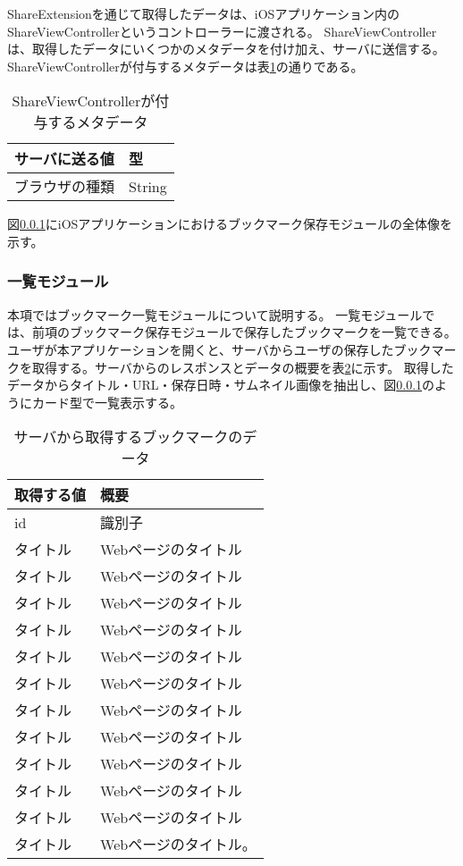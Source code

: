 ShareExtensionを通じて取得したデータは、iOSアプリケーション内のShareViewControllerというコントローラーに渡される。
ShareViewControllerは、取得したデータにいくつかのメタデータを付け加え、サーバに送信する。
ShareViewControllerが付与するメタデータは表\ref{tb:ios-meta-data}の通りである。

\begin{table}[htbp]
  \label{tb:ios-meta-data}
  \caption{ShareViewControllerが付与するメタデータ}
  \begin{center}
    \begin{tabular}{|l|l|}
    \hline
    サーバに送る値 & 型 \\ \hline
    ブラウザの種類 & String \\ \hline
    \end{tabular}
  \end{center}
\end{table}

図\ref{}にiOSアプリケーションにおけるブックマーク保存モジュールの全体像を示す。

\subsubsection{一覧モジュール}
本項ではブックマーク一覧モジュールについて説明する。
一覧モジュールでは、前項のブックマーク保存モジュールで保存したブックマークを一覧できる。
ユーザが本アプリケーションを開くと、サーバからユーザの保存したブックマークを取得する。サーバからのレスポンスとデータの概要を表\ref{tb:ios-bookmark-response}に示す。
取得したデータからタイトル・URL・保存日時・サムネイル画像を抽出し、図\ref{}のようにカード型で一覧表示する。

\begin{table}[htbp]
  \label{tb:ios-bookmark-response}
  \caption{サーバから取得するブックマークのデータ}
  \begin{center}
    \begin{tabular}{|l|l|}
    \hline
    取得する値 & 概要 \\ \hline
    id & 識別子 \\ \hline
    タイトル & Webページのタイトル \\ \hline
    タイトル & Webページのタイトル \\ \hline
    タイトル & Webページのタイトル \\ \hline
    タイトル & Webページのタイトル \\ \hline
    タイトル & Webページのタイトル \\ \hline
    タイトル & Webページのタイトル \\ \hline
    タイトル & Webページのタイトル \\ \hline
    タイトル & Webページのタイトル \\ \hline
    タイトル & Webページのタイトル \\ \hline
    タイトル & Webページのタイトル \\ \hline
    タイトル & Webページのタイトル \\ \hline
    タイトル & Webページのタイトル。 \\ \hline
    \end{tabular}
  \end{center}
\end{table}

